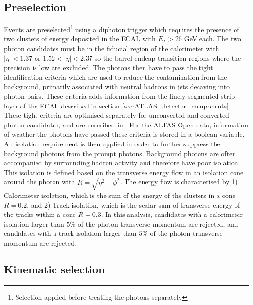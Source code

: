 \documentclass[10pt, aps, twocolumn, a4paper, nofootinbib]{revtex4}
\begin{document}
\subsection{Preselection}

Events are preselected\footnote{Selection applied before treating the photons separately} using a diphoton trigger which requires the presence of two clusters of energy deposited in the ECAL with $E_T > 25$ GeV each. The two photon candidates must be in the fiducial region of the calorimeter with $|\eta|< 1.37$ or $1.52 < |\eta|<2.37$ so the barrel-endcap transition regions where the precision is low are excluded. The photons then have to pass the tight identification criteria which are used to reduce the contamination from the background, primarily associated with neutral hadrons in jets decaying into photon pairs. These criteria adds information from the finely segmented strip layer of the ECAL described in section \ref{sec:ATLAS_detector_components}. These tight criteria are optimised separately for unconverted and converted photon candidates, and are described in \citep{Aaboud_2019_tight}. For the ALTAS Open data, information of weather the photons have passed these criteria is stored in a boolean variable.\\

An isolation requirement is then applied in order to further suppress the background photons from the prompt photons. Background photons are often accompanied by surrounding hadron activity and therefore have poor isolation. This isolation is defined based on the transverse energy flow in an isolation cone around the photon with $R = \sqrt{\eta^2 -\phi^2}$. The energy flow is characterised by 1) Calorimeter isolation, which is the sum of the energy of the clusters in a cone $R = 0.2$, and 2) Track isolation, which is the scalar sum of transverse energy of the tracks within a cone $R = 0.3$. In this analysis, candidates with a calorimeter isolation larger than $5\%$ of the photon transverse momentum are rejected, and candidates with a track isolation larger than $5\%$ of the photon transverse momentum are rejected.\\

\subsection{Kinematic selection}
\end{document}
